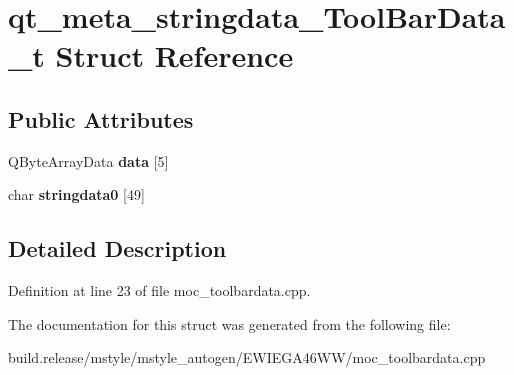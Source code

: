 \hypertarget{structqt__meta__stringdata___tool_bar_data__t}{}\section{qt\+\_\+meta\+\_\+stringdata\+\_\+\+Tool\+Bar\+Data\+\_\+t Struct Reference}
\label{structqt__meta__stringdata___tool_bar_data__t}
\subsection*{Public Attributes}
\begin{DoxyCompactItemize}
\item 
\mbox{\label{structqt__meta__stringdata___tool_bar_data__t_ae8f889ce3ad60748705a72f5628d1069}} 
Q\+Byte\+Array\+Data {\bfseries data} \mbox{[}5\mbox{]}
\item 
\mbox{\label{structqt__meta__stringdata___tool_bar_data__t_a8469a4698b460595a5976b5dab1720bc}} 
char {\bfseries stringdata0} \mbox{[}49\mbox{]}
\end{DoxyCompactItemize}


\subsection{Detailed Description}


Definition at line 23 of file moc\+\_\+toolbardata.\+cpp.



The documentation for this struct was generated from the following file\+:\begin{DoxyCompactItemize}
\item 
build.\+release/mstyle/mstyle\+\_\+autogen/\+E\+W\+I\+E\+G\+A46\+W\+W/moc\+\_\+toolbardata.\+cpp\end{DoxyCompactItemize}
